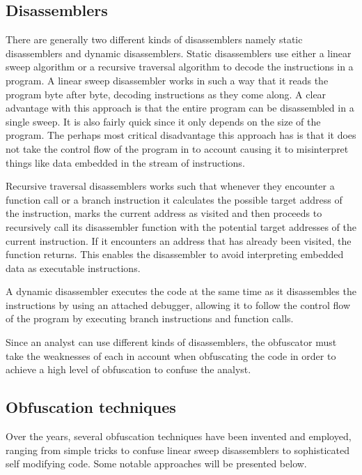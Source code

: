 \documentclass[11pt,twoside]{eitExjobb}
\begin{document}
\subsection{Disassemblers}
There are generally two different kinds of disassemblers namely static disassemblers and dynamic disassemblers. Static disassemblers use either a linear sweep algorithm or a recursive traversal algorithm to decode the instructions in a program. A linear sweep disassembler works in such a way that it reads the program byte after byte, decoding instructions as they come along. A clear advantage with this approach is that the entire program can be disassembled in a single sweep. It is also fairly quick since it only depends on the size of the program. The perhaps most critical disadvantage this approach has is that it does not take the control flow of the program in to account causing it to misinterpret things like data embedded in the stream of instructions.

Recursive traversal disassemblers works such that whenever they encounter a function call or a branch instruction it calculates the possible target address of the instruction, marks the current address as visited and then proceeds to recursively call its disassembler function with the potential target addresses of the current instruction. If it encounters an address that has already been visited, the function returns. This enables the disassembler to avoid interpreting embedded data as executable instructions.

A dynamic disassembler executes the code at the same time as it disassembles the instructions by using an attached debugger, allowing it to follow the control flow of the program by executing branch instructions and function calls. 

Since an analyst can use different kinds of disassemblers, the obfuscator must take the weaknesses of each in account when obfuscating the code in order to achieve a high level of obfuscation to confuse the analyst.

\subsection{Obfuscation techniques}
Over the years, several obfuscation techniques have been invented and employed, ranging from simple tricks to confuse linear sweep disassemblers to sophisticated self modifying code. Some notable approaches will be presented below.
\end{document}
